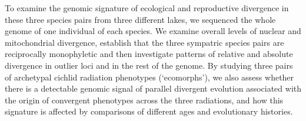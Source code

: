 To examine the genomic signature of ecological and reproductive divergence in these three species pairs from three different lakes, we sequenced the whole genome of one individual of each species. We examine overall levels of nuclear and mitochondrial divergence, establish that the three sympatric species pairs are reciprocally monophyletic and then investigate patterns of relative and absolute divergence in outlier loci and in the rest of the genome. By studying three pairs of archetypal cichlid radiation phenotypes (`ecomorphs'), we also assess whether there is a detectable genomic signal of parallel divergent evolution associated with the origin of convergent phenotypes across the three radiations, and how this signature is affected by comparisons of different ages and evolutionary histories.
